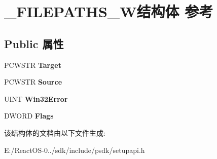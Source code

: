\hypertarget{struct___f_i_l_e_p_a_t_h_s___w}{}\section{\+\_\+\+F\+I\+L\+E\+P\+A\+T\+H\+S\+\_\+\+W结构体 参考}
\label{struct___f_i_l_e_p_a_t_h_s___w}
\subsection*{Public 属性}
\begin{DoxyCompactItemize}
\item 
\mbox{\label{struct___f_i_l_e_p_a_t_h_s___w_ae63e545515840cc4df12fd1207be44c9}} 
P\+C\+W\+S\+TR {\bfseries Target}
\item 
\mbox{\label{struct___f_i_l_e_p_a_t_h_s___w_ac609ee00271f03f88f613e9b0366159d}} 
P\+C\+W\+S\+TR {\bfseries Source}
\item 
\mbox{\label{struct___f_i_l_e_p_a_t_h_s___w_ab7bdd7ded6341fde526decc0c7522e84}} 
U\+I\+NT {\bfseries Win32\+Error}
\item 
\mbox{\label{struct___f_i_l_e_p_a_t_h_s___w_a1608482774df56a54194b3326c769eea}} 
D\+W\+O\+RD {\bfseries Flags}
\end{DoxyCompactItemize}


该结构体的文档由以下文件生成\+:\begin{DoxyCompactItemize}
\item 
E\+:/\+React\+O\+S-\/0../sdk/include/psdk/setupapi.\+h\end{DoxyCompactItemize}
